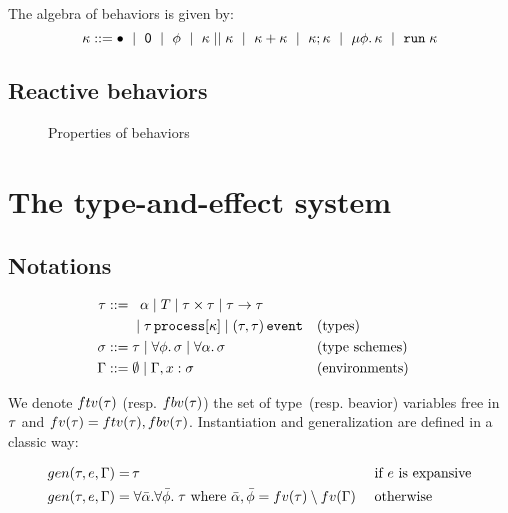 \documentclass[9pt,preprint]{sigplanconf}
\newcommand{\sdeq}{::=}
\begin{document}
The algebra of behaviors is given by:
\[
\rk \sdeq \effplus ~\mid~ \effmin ~\mid~ \effvar ~\mid~ \effpar{\rk}{\rk} ~\mid~ \effor{\rk}{\rk}
~\mid~ \effcon{\rk}{\rk}  ~\mid~ \effrec{\effvar}{\rk}  ~\mid~ \effrun{\rk}
\]

\subsection{Reactive behaviors}

\begin{figure*}



\caption{Properties of behaviors}
\end{figure*}


\section{The type-and-effect system}

\subsection{Notations}

\begin{align*}
\rt \sdeq &\;\;\; \rtvar \mid T \mid \rtprod{\rt}{\rt} \mid \rtarrow{\rt}{\rt} \\
    &\;\mid \rtproc{\rt}{\rk} \mid \rtsig{\rt}{\rt} && \text{(types)} \\
\rs \sdeq &\; \rt \mid \forall \effvar.\, \rs \mid \forall \rtvar.\, \rs && \text{(type schemes)} \\
\tyenv \sdeq&\; \emptyset \mid \tyenv \tyconcat x : \rs && \text{(environments)}
\end{align*}

We denote $ftv(\tau)$ (resp. $fbv(\tau)$) the set of type~(resp. beavior) variables free in $\tau$ and $fv(\tau) = ftv(\tau), fbv(\tau)$. Instantiation and generalization are defined in a classic way:
\vspace{-1.3em}
\begin{align*}
gen(\tau, e, \Gamma) = &\, \tau && \text { if $e$ is expansive} \\
gen(\tau, e, \Gamma) = &\; \forall \bar{\alpha}.\forall \bar{\phi}.\; \tau 
   \text{ where }  \bar{\alpha}, \bar{\phi} = fv(\tau) \setminus fv(\Gamma)  
   && \text{ otherwise } 
\end{align*}
\end{document}
